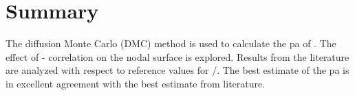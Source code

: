 \section{Summary}
The diffusion Monte Carlo (DMC) method is used to calculate the \gls{pa} of .
The effect of - correlation on the nodal surface is explored.
Results from the literature are analyzed with respect to reference values for /.
The best estimate of the \gls{pa} is in excellent agreement with the best estimate from literature.
